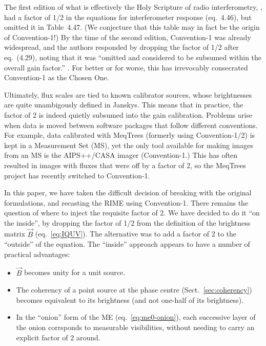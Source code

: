 \documentclass[]{aa}
\begin{document}
The first edition of what is effectively the Holy Scripture of radio interferometry, \citet*{tms1}, had a factor of 1/2 in the equations for interferometer response (eq.~4.46), but omitted it in Table~4.47. (We conjecture that this table may in fact be the origin of Convention-1!) By the time of the second edition, Convention-1 was already widespread, and the authors responded by dropping the factor of 1/2 after eq.~(4.29), noting that it was ``omitted and considered to be subsumed within the overall gain factor.'' \citep[see p. 102]{tms}. For better or for worse, this has irrevocably consecrated Convention-1 as the Chosen One.

Ultimately, flux scales are tied to known calibrator sources, whose brightnesses are quite unambigously defined in Janskys. This means that in practice, the factor of 2 is indeed quietly subsumed into the gain calibration. Problems arise when data is moved between software packages that follow different conventions. For example, data calibrated with MeqTrees (formerly using 
Convention-1/2) is kept in a Measurement Set (MS), yet the only tool available for making images from an MS is the AIPS++/CASA imager (Convention-1.) This has often resulted in images with fluxes that were off by a factor of 2, so the MeqTrees project has recently switched to Convention-1.

In this paper, we have taken the difficult decision of breaking with the original formulations, and recasting the RIME using Convention-1. There remains the question of where to inject the requisite factor of 2. We have decided to do it ``on the inside'', by dropping the factor of 1/2 from the \citet{ME4} definition of the brightness matrix $\vec B$ (eq.~\ref{eq:IQUV}). The alternative was to add a factor of 2 to the ``outside'' of the equation. The ``inside'' approach appears to have a number of practical advantages:

\begin{itemize}
\item $\vec B$ becomes unity for a unit source.
\item The coherency of a point source at the phase centre (Sect.~\ref{sec:coherency}) becomes equivalent to its brightness (and not one-half of its brightness).
\item In the ``onion'' form of the ME (eq.~\ref{eq:me0-onion}), each successive layer of the onion corrsponds to measurable visibilities, without needing to carry an explicit factor of 2 around.
\end{itemize}
\end{document}
